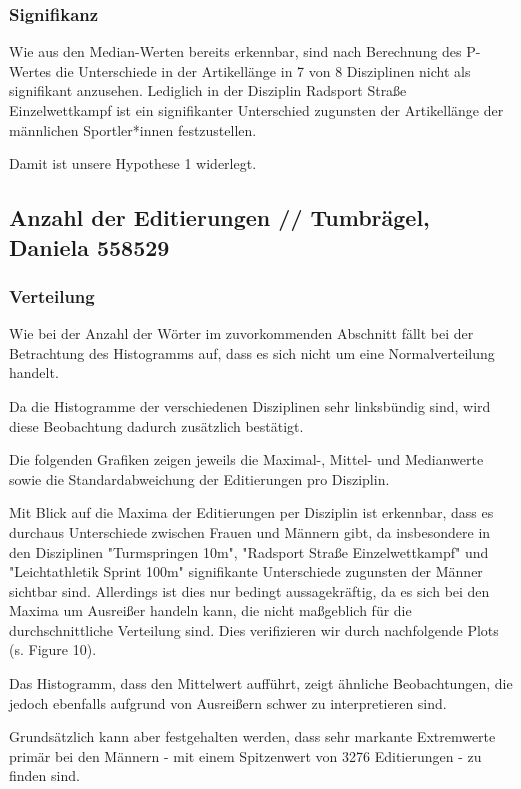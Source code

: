 \documentclass[11pt]{article}
\begin{document}
\subsubsection{Signifikanz}
Wie aus den Median-Werten bereits erkennbar, sind nach Berechnung des P-Wertes die Unterschiede in der Artikellänge in 7 von 8 Disziplinen nicht als signifikant anzusehen. Lediglich in der Disziplin Radsport Straße Einzelwettkampf ist ein signifikanter Unterschied zugunsten der Artikellänge der männlichen Sportler*innen festzustellen.

Damit ist unsere Hypothese 1 widerlegt.



\subsection{Anzahl der Editierungen // Tumbrägel, Daniela 558529}
\subsubsection{Verteilung}
Wie bei der Anzahl der Wörter im zuvorkommenden Abschnitt fällt bei der Betrachtung des Histogramms auf, dass es sich nicht um eine Normalverteilung handelt.

Da die Histogramme der verschiedenen Disziplinen sehr linksbündig sind, wird diese Beobachtung dadurch zusätzlich bestätigt. 

Die folgenden Grafiken zeigen jeweils die Maximal-, Mittel- und Medianwerte sowie die Standardabweichung der Editierungen pro Disziplin. 

Mit Blick auf die Maxima der Editierungen per Disziplin ist erkennbar, dass es durchaus Unterschiede zwischen Frauen und Männern gibt, da insbesondere in den Disziplinen "Turmspringen 10m", "Radsport Straße Einzelwettkampf" und "Leichtathletik Sprint 100m" signifikante Unterschiede zugunsten der Männer sichtbar sind. Allerdings ist dies nur bedingt aussagekräftig, da es sich bei den Maxima um Ausreißer handeln kann, die nicht maßgeblich für die durchschnittliche Verteilung sind. Dies verifizieren wir durch nachfolgende Plots (s. Figure 10).

Das Histogramm, dass den Mittelwert aufführt, zeigt ähnliche Beobachtungen, die jedoch ebenfalls aufgrund von Ausreißern schwer zu interpretieren sind.

Grundsätzlich kann aber festgehalten werden, dass sehr markante Extremwerte primär bei den Männern - mit einem Spitzenwert von 3276 Editierungen - zu finden sind.
\end{document}
